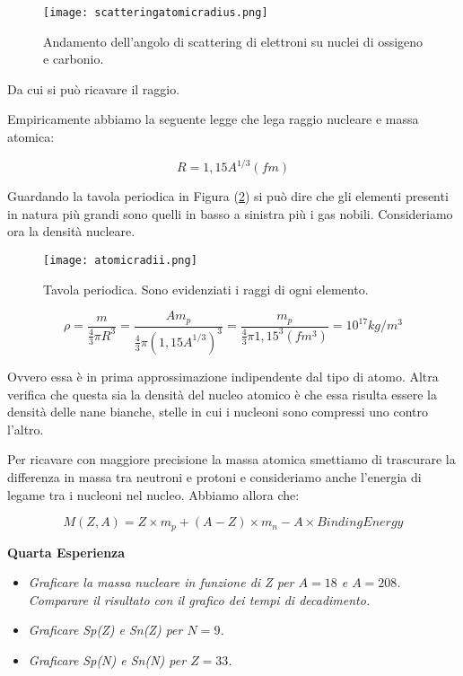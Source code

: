 \documentclass [a4paper, twoside] {book}
\begin{document}
\begin{figure} []
\centering
		\texttt{[image: scatteringatomicradius.png]}
		\caption{Andamento dell'angolo di scattering di elettroni su nuclei di ossigeno e carbonio.}
         \label{scatteringatomicradius}
\end{figure}

Da cui si può ricavare il raggio.

Empiricamente abbiamo la seguente legge che lega raggio nucleare e massa atomica:

\begin{equation}
R=1,15A^{1/3} (fm)
\end{equation}

Guardando la tavola periodica in Figura (\ref{atomicradii}) si può dire che gli elementi presenti in natura più grandi sono quelli in basso a sinistra più i gas nobili.
Consideriamo ora la densità nucleare. 

\begin{figure} []
\centering
		\texttt{[image: atomicradii.png]}
		\caption{Tavola periodica. Sono evidenziati i raggi di ogni elemento.}
         \label{atomicradii}
\end{figure}

\begin{equation}
\rho=\frac{m}{\frac{4}{3}\pi R^3}=\frac{Am_p}{\frac{4}{3}\pi (1,15 A^{1/3})^3}=\frac{m_p}{\frac{4}{3}\pi 1,15^3 (fm^3)} = 10^{17} kg/m^3
\end{equation}

Ovvero essa è in prima approssimazione indipendente dal tipo di atomo. 
Altra verifica che questa sia la densità del nucleo atomico è che essa risulta essere la densità delle nane bianche, stelle in cui i nucleoni sono compressi uno contro l'altro.
                                                                                                                    
Per ricavare con maggiore precisione la massa atomica smettiamo di trascurare la differenza in massa tra neutroni e protoni e consideriamo anche l'energia di legame tra i nucleoni nel nucleo. Abbiamo allora che:

\begin{equation}
M(Z,A)=Z\times m_p+(A-Z)\times m_n-A\times BindingEnergy
\end{equation}

\textbf{Quarta Esperienza}

\begin{itemize}
\item \emph{Graficare la massa nucleare in funzione di Z per $A=18$ e $A=208$. Comparare il risultato con il grafico dei tempi di decadimento.}
\item \emph{Graficare Sp(Z) e Sn(Z) per $N=9$.}
\item \emph{Graficare Sp(N) e Sn(N) per $Z=33$.}
\end{itemize}
\end{document}
